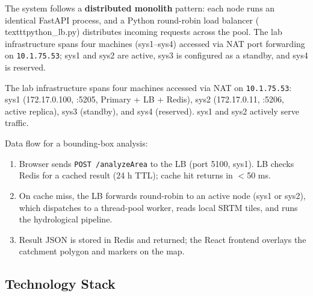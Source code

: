 \documentclass[manuscript,screen,review]{acmart}
\begin{document}
The system follows a \textbf{distributed monolith} pattern: each
node runs an identical FastAPI process, and a Python round-robin load
balancer (\\texttt{python\_lb.py}) distributes incoming requests
across the pool. The lab infrastructure spans four machines
(sys1--sys4) accessed via NAT port forwarding on
\texttt{10.1.75.53}; sys1 and sys2 are active, sys3 is configured
as a standby, and sys4 is reserved.

The lab infrastructure spans four machines accessed via NAT on
\texttt{10.1.75.53}: sys1 (172.17.0.100, :5205, Primary + LB +
Redis), sys2 (172.17.0.11, :5206, active replica), sys3 (standby),
and sys4 (reserved). sys1 and sys2 actively serve traffic.

Data flow for a bounding-box analysis:
\begin{enumerate}
  \item Browser sends \texttt{POST /analyzeArea} to the LB (port 5100,
        sys1). LB checks Redis for a cached result (24 h TTL);
        cache hit returns in $<$50 ms.
  \item On cache miss, the LB forwards round-robin to an active node
        (sys1 or sys2), which dispatches to a thread-pool worker,
        reads local SRTM tiles, and runs the hydrological pipeline.
  \item Result JSON is stored in Redis and returned; the React
        frontend overlays the catchment polygon and markers on the map.
\end{enumerate}

\subsection{Technology Stack}
\end{document}
